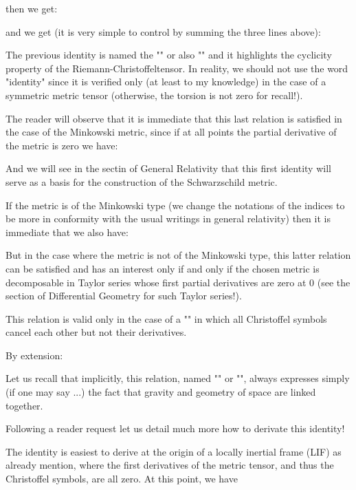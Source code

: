 	then we get:
	
	and we get (it is very simple to control by summing the three lines above):
	
	The previous identity is named the "\label{first bianchi identity}" or also "" and it highlights the cyclicity property of the  Riemann-Christoffeltensor. In reality, we should not use the word "identity" since it is verified only (at least to my knowledge) in the case of a symmetric metric tensor (otherwise, the torsion is not zero for recall!).

	The reader will observe that it is immediate that this last relation is satisfied in the case of the Minkowski metric, since if at all points the partial derivative of the metric is zero we have:
	
	And we will see in the sectin of General Relativity that this first identity will serve as a basis for the construction of the Schwarzschild metric.

	If the metric is of the Minkowski type (we change the notations of the indices to be more in conformity with the usual writings in general relativity) then it is immediate that we also have:
	
	But in the case where the metric is not of the Minkowski type, this latter relation can be satisfied and has an interest only if and only if the chosen metric is decomposable in Taylor series whose first partial derivatives are zero at $0$ (see the section of Differential Geometry for such Taylor series!).

	This relation is valid only in the case of a "" in which all Christoffel symbols cancel each other but not their derivatives.

	By extension:
	
	Let us recall that implicitly, this relation, named "\label{Bianchi second identity}" or "", always expresses simply (if one may say ...) the fact that gravity and geometry of space are linked together.

	Following a reader request let us detail much more how to derivate this identity!

	The identity is easiest to derive at the origin of a locally inertial frame (LIF) as already mention, where the first derivatives of the metric tensor, and thus the Christoffel symbols, are all zero. At this point, we have
	
